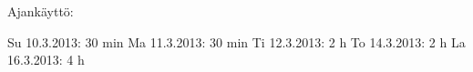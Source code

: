 Ajankäyttö:

Su 10.3.2013: 30 min
Ma 11.3.2013: 30 min
Ti 12.3.2013: 2 h
To 14.3.2013: 2 h
La 16.3.2013: 4 h
